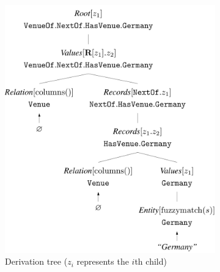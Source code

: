\begin{figure}
\centering
\begin{subfigure}[b]{\textwidth}\centering
\includegraphics[scale=.35]{sfig/parsetrees.slides/macroParseOrig.pdf}
\caption{Derivation tree ($z_i$ represents the $i$th child)}
\label{fig:compute-macro-a}
\end{subfigure} \\[1em]
\begin{subfigure}[b]{0.40\textwidth}\centering

\end{subfigure}
\end{figure}
